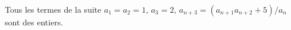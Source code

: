 Tous les termes de la suite $a_1 = a_2 = 1$, $a_3 = 2$, $a_{n+3} = (a_{n+1}a_{n+2} + 5)/a_n$ sont des entiers.
